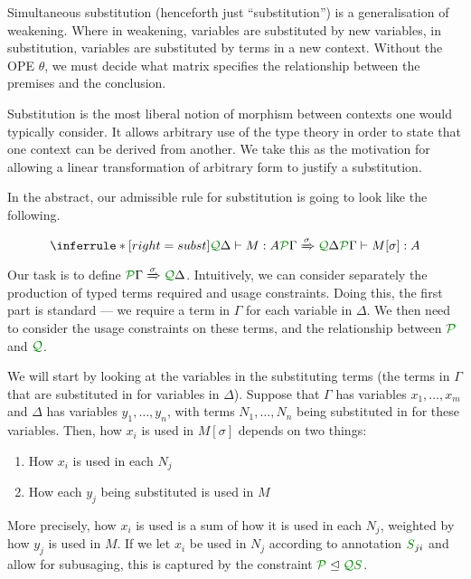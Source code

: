 \documentclass[submission,copyright,creativecommons]{eptcs}
\begin{document}
Simultaneous substitution (henceforth just ``substitution'') is a generalisation
of weakening.
Where in weakening, variables are substituted by new variables, in substitution,
variables are substituted by terms in a new context.
Without the OPE $\theta$, we must decide what matrix specifies the relationship
between the premises and the conclusion.

Substitution is the most liberal notion of morphism between contexts one would
typically consider.
It allows arbitrary use of the type theory in order to state that one context
can be derived from another.
We take this as the motivation for allowing a linear transformation of arbitrary
form to justify a substitution.

In the abstract, our admissible rule for substitution is going to look like the
following.

\[
  \inferrule*[right=subst]{
    \ctx{\Delta}{Q} \vdash M : A
    \\ \ctx{\Gamma}{P} \subst{\sigma} \ctx{\Delta}{Q}
  }
  {
    \ctx{\Gamma}{P} \vdash M[\sigma] : A
  }
\]

Our task is to define $\ctx{\Gamma}{P} \subst{\sigma} \ctx{\Delta}{Q}$.
Intuitively, we can consider separately the production of typed terms required
and usage constraints.
Doing this, the first part is standard --- we require a term in $\Gamma$ for
each variable in $\Delta$.
We then need to consider the usage constraints on these terms, and the
relationship between $\resctx P$ and $\resctx Q$.

We will start by looking at the variables in the substituting terms (the terms
in $\Gamma$ that are substituted in for variables in $\Delta$).
Suppose that $\Gamma$ has variables $x_1, \ldots, x_m$ and $\Delta$ has
variables $y_1, \ldots, y_n$, with terms $N_1, \ldots, N_n$ being substituted in
for these variables.
Then, how $x_i$ is used in $M[\sigma]$ depends on two things:

\begin{enumerate}
\item How $x_i$ is used in each $N_j$
\item How each $y_j$ being substituted is used in $M$
\end{enumerate}

More precisely, how $x_i$ is used is a sum of how it is used in each $N_j$,
weighted by how $y_j$ is used in $M$.
If we let $x_i$ be used in $N_j$ according to annotation $\resmat S_{ji}$ and
allow for subusaging, this is captured by the constraint
$\resctx P \subres \resctx Q \resmat S$.
\end{document}
